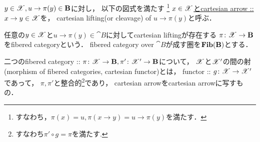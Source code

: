 \documentclass[a4paper, dvipdfmx]{jsarticle}
\begin{document}
\begin{Def}
\begin{myenum}
\item
    $y \in \mathscr{X}, u \to \pi(y) \in \mathbf{B}$に対し，
    以下の図式を満たす
    \footnote{すなわち，$\pi(x)=u, \pi(x \to y)=u \to \pi(y)$を満たす．}
    \underline{$x \in \mathscr{X}$とcartesian arrow :: $x \to y \in \mathscr{X}$}を，
    cartesian lifting(or cleavage) of $u \to \pi(y)$と呼ぶ．
    \begin{center}
    \end{center}

\item
    任意の$y \in \mathscr{X}$と$u \to \pi(y) \in \cat{B}$に対してcartesian liftingが存在する
    $\pi \colon \mathscr{X} \to \mathbf{B}$をfibered categoryという．
    fibered category over $\cat{B}$が成す圏を$\mathbf{Fib}(\mathbf{B})$とする．

\item
    二つのfibered category :: 
    $\pi \colon \mathscr{X} \to \mathbf{B}, \pi' \colon \mathscr{X}' \to \mathbf{B}$について，
    $\mathscr{X}$と$\mathscr{X}'$の間の射(morphism of fibered categories, cartesian functor)とは，
    functor :: $g \colon \mathscr{X} \to \mathscr{X}'$であって，
    $\pi, \pi'$と整合的\footnote{ すなわち$\pi' \circ g=\pi$を満たす. }であり，
    cartesian arrowをcartesian arrowに写すもの．

\item
\end{myenum}
\end{Def}
\end{document}
